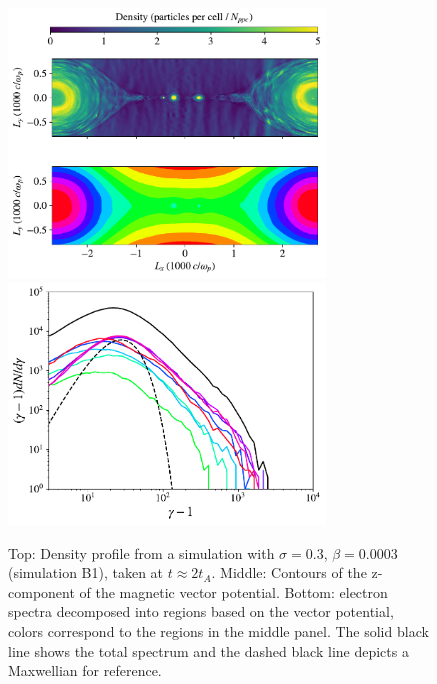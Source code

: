 \begin{figure}[!h]
\centering
\includegraphics[width =0.75\textwidth]{shellvec_flds.pdf}
\includegraphics[width =0.75\textwidth]{shellvec_spect.pdf}
\caption{Top: Density profile from a simulation with $\sigma=0.3$, $\beta=0.0003$ (simulation B1), taken at $t\approx 2 t_{A}$.  Middle: Contours of the z-component of the magnetic vector potential.  Bottom: electron spectra decomposed into regions based on the vector potential, colors correspond to the regions in the middle panel.  The solid black line shows the total spectrum and the dashed black line depicts a Maxwellian for reference.}
\label{shellvec_spect}
\end{figure}

